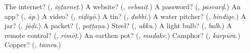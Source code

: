 \begin{tcolorbox}[breakable,colback=teal!4,colframe=teal!35!black,title={Before you move on}]
The internet? (\textbf{}, \emph{iṇṭarneṭ}.) A website? (\textbf{}, \emph{vebsaiṭ}.) A password? (\textbf{}, \emph{pāsvarḍ}.) An app? (\textbf{}, \emph{āp}.) A video? (\textbf{}, \emph{viḍiyō}.) A tin? (\textbf{}, \emph{ḍabbi}.) A water pitcher? (\textbf{}, \emph{bindige}.) A jar? (\textbf{}, \emph{jāḍi}.) A packet? (\textbf{}, \emph{poṭṭaṇa}.) Steel? (\textbf{}, \emph{ukku}.) A light bulb? (\textbf{}, \emph{balb}.) A remote control? (\textbf{}, \emph{rimōṭ}.) An earthen pot? (\textbf{}, \emph{maḍake}.) Camphor? (\textbf{}, \emph{karpūra}.) Copper? (\textbf{}, \emph{tāmra}.)
\end{tcolorbox}
